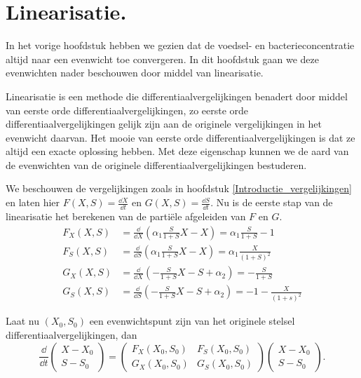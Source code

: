 
\chapter{Linearisatie.}
\label{Linearisatie}

In het vorige hoofdstuk hebben we gezien dat de voedsel- en bacterieconcentratie altijd naar een evenwicht toe convergeren. In dit hoofdstuk gaan we deze evenwichten nader beschouwen door middel van linearisatie.

Linearisatie is een methode die differentiaalvergelijkingen benadert door middel van eerste orde differentiaalvergelijkingen, zo eerste orde differentiaalvergelijkingen gelijk zijn aan de originele vergelijkingen in het evenwicht daarvan. Het mooie van eerste orde differentiaalvergelijkingen is dat ze altijd een exacte oplossing hebben. Met deze eigenschap kunnen we de aard van de evenwichten van de originele differentiaalvergelijkingen bestuderen.

We beschouwen de vergelijkingen zoals in hoofdstuk \ref{Introductie_vergelijkingen} en laten hier $F(X,S) = \frac{\dd X}{\dd t}$ en $G(X,S) = \frac{\dd S}{\dd t}$. Nu is de eerste stap van de linearisatie het berekenen van de parti\"ele afgeleiden van $F$ en $G$.
\begin{align*}
F_X(X,S) &= \frac{\dd}{\dd X}(\alpha_1 \frac{S}{1 + S} X - X) = \alpha_1\frac{S}{1 + S} - 1\\
F_S(X,S) &= \frac{\dd}{\dd S}(\alpha_1 \frac{S}{1 + S} X - X) = \alpha_1\frac{X}{(1+S)^2}\\
G_X(X,S) &= \frac{\dd}{\dd X}(-\frac{S}{1 + S}X - S + \alpha_2) = -\frac{S}{1 + S}\\
G_S(X,S) &= \frac{\dd}{\dd S}(-\frac{S}{1 + S}X - S + \alpha_2) = -1-\frac{X}{(1+s)^2}
\end{align*}

Laat nu $(X_0, S_0)$ een evenwichtspunt zijn van het originele stelsel differentiaalvergelijkingen, dan
\[\frac{\dd}{\dd t}\left( \begin{array}{c}
X-X_0 \\
S-S_0 \end{array} \right)
= \left( \begin{array}{cc}
F_X(X_0,S_0) & F_S(X_0,S_0) \\
G_X(X_0,S_0) & G_S(X_0,S_0) \end{array} \right)
\left( \begin{array}{c}
X-X_0 \\
S-S_0 \end{array} \right).\]

